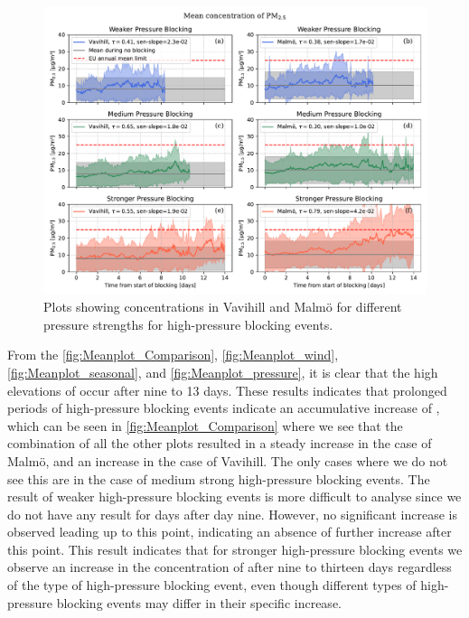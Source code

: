 \begin{figure}[H]
    \centering
    \includegraphics[width=\textwidth]{Figures/Meanplot_pressure.pdf}
    \caption{Plots showing \PM concentrations in Vavihill and Malmö for different pressure strengths for high-pressure blocking events.}
    \label{fig:Meanplot_pressure}
\end{figure}

From the \autoref{fig:Meanplot_Comparison}, \autoref{fig:Meanplot_wind}, \autoref{fig:Meanplot_seasonal}, and \autoref{fig:Meanplot_pressure}, it is clear that the high elevations of \PM  occur after nine to 13 days. These results indicates that prolonged periods of high-pressure blocking events indicate an accumulative increase of \PM, which can be seen in \autoref{fig:Meanplot_Comparison} where we see that the combination of all the other plots resulted in a steady increase in the case of Malmö, and an increase in the case of Vavihill. The only cases where we do not see this are in the case of medium strong high-pressure blocking events. The result of weaker high-pressure blocking events is more difficult to analyse since we do not have any result for days after day nine. However, no significant increase is observed leading up to this point, indicating an absence of further increase after this point. This result indicates that for stronger high-pressure blocking events we observe an increase in the concentration of \PM  after nine to thirteen days regardless of the type of high-pressure blocking event, even though different types of high-pressure blocking events may differ in their specific increase.

